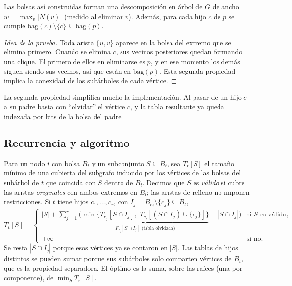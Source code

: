\begin{lemma}\label{lem:elim}
Las bolsas así construidas forman una descomposición en árbol de $G$ de ancho $w=\max_v|N(v)|$ (medido al eliminar $v$). Además, para cada hijo $c$ de $p$ se cumple $\mathrm{bag}(c)\setminus\{c\}\subseteq\mathrm{bag}(p)$.
\end{lemma}
\begin{proof}[Idea de la prueba]
Toda arista $\{u,v\}$ aparece en la bolsa del extremo que se elimina primero. Cuando se elimina $c$, sus vecinos posteriores quedan formando una clique. El primero de ellos en eliminarse es $p$, y en ese momento los demás siguen siendo sus vecinos, así que están en $\mathrm{bag}(p)$. Esta segunda propiedad implica la conexidad de los subárboles de cada vértice.
\end{proof}
La segunda propiedad simplifica mucho la implementación. Al pasar de un hijo $c$ a su padre basta con ``olvidar'' el vértice $c$, y la tabla resultante ya queda indexada por bits de la bolsa del padre.

\subsection{Recurrencia y algoritmo}
Para un nodo $t$ con bolsa $B_t$ y un subconjunto $S\subseteq B_t$, sea $T_t[S]$ el tamaño mínimo de una cubierta del subgrafo inducido por los vértices de las bolsas del subárbol de $t$ que coincida con $S$ dentro de $B_t$. Decimos que $S$ es \emph{válido} si cubre las aristas \emph{originales} con ambos extremos en $B_t$; las aristas de relleno no imponen restricciones. Si $t$ tiene hijos $c_1,\dots,c_r$, con $I_j=B_{c_j}\setminus\{c_j\}\subseteq B_t$,
\begin{equation}\label{eq:dp}
T_t[S]=\begin{cases}
\displaystyle |S|+\sum_{j=1}^{r}\Big(\underbrace{\min\big\{T_{c_j}[S\cap I_j],\;T_{c_j}[(S\cap I_j)\cup\{c_j\}]\big\}}_{F_{c_j}[S\cap I_j]\text{ (tabla olvidada)}}-|S\cap I_j|\Big) & \text{si $S$ es válido,}\\[4pt]
+\infty & \text{si no.}
\end{cases}
\end{equation}
Se resta $|S\cap I_j|$ porque esos vértices ya se contaron en $|S|$. Las tablas de hijos distintos se pueden sumar porque sus subárboles solo comparten vértices de $B_t$, que es la propiedad separadora. El óptimo es la suma, sobre las raíces (una por componente), de $\min_S T_r[S]$.

